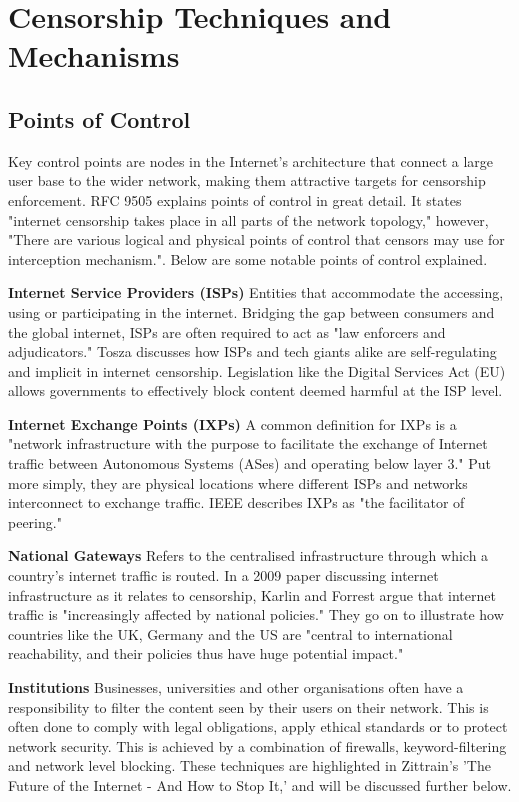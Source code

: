 \section{Censorship Techniques and Mechanisms} 

\subsection{Points of Control}
Key control points are nodes in the Internet’s architecture that connect a large user base to the wider network, making them attractive targets for censorship enforcement. RFC 9505 explains points of control in great detail. It states "internet censorship takes place in all parts of the network topology," however, "There are various logical and physical points of control that censors may use for interception mechanism."\cite{rfc9505}. Below are some notable points of control explained.

\textbf{Internet Service Providers (ISPs)}
Entities that accommodate the accessing, using or participating in the internet. Bridging the gap between consumers and the global internet, ISPs are often required to act as "law enforcers and adjudicators." \cite{TOSZA2021105614} Tosza discusses how ISPs and tech giants alike are self-regulating and implicit in internet censorship. Legislation like the Digital Services Act (EU) allows governments to effectively block content deemed harmful at the ISP level.

\textbf{Internet Exchange Points (IXPs)}
A common definition for IXPs is a "network infrastructure with the purpose to facilitate the exchange of Internet traffic between Autonomous Systems (ASes) and operating below layer 3." \cite{DBLP:journals/corr/ChatzisSF13} Put more simply, they are physical locations where different ISPs and networks interconnect to exchange traffic. IEEE describes IXPs as "the facilitator of peering." \cite{6089065}

\textbf{National Gateways}
Refers to the centralised infrastructure through which a country's internet traffic is routed. In a 2009 paper discussing internet infrastructure as it relates to censorship, Karlin and Forrest argue that internet traffic is "increasingly affected by national policies." \cite{DBLP:journals/corr/abs-0903-3218} They go on to illustrate how countries like the UK, Germany and the US are "central to international reachability, and their policies thus have huge potential impact." \cite{DBLP:journals/corr/abs-0903-3218}

\textbf{Institutions}
Businesses, universities and other organisations often have a responsibility to filter the content seen by their users on their network. This is often done to comply with legal obligations, apply ethical standards or to protect network security. This is achieved by a combination of firewalls, keyword-filtering and network level blocking. These techniques are highlighted in Zittrain's 'The Future of the Internet - And How to Stop It,' \cite{zittrain2008future} and will be discussed further below.

